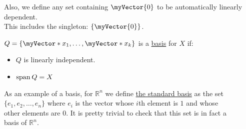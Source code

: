 \documentclass{book}
\newcommand{\teachComment}{
   \color{Orange}%
   \fontsize{12}{14}\selectfont%
}
\newcommand{\exOne}{%
   \color{Purple}%
   \fontsize{14}{16}\selectfont%
}
\newenvironment{myIndent}{%
   \begin{adjustwidth}{2.5em}{0em}%
}{%
   \end{adjustwidth}%
}
\newenvironment{myDindent}{%
   \begin{adjustwidth}{5em}{0em}%
}{%
   \end{adjustwidth}%
}
\newcommand{\udefine}[1]{{%
   \setulcolor{Red}%
   \setul{0.14em}{0.07em}%
   \ul{#1}%
}}
\newcommand{\mySpan}{\mathrm{span}}
\newcommand{\mySepTwo}[1][.]{%
   {\noindent\color{#1}{\rule{6.5in}{0.5mm}}}\\%
}
\newcommand{\retTwo}{\hfill\bigbreak}
\newcommand{\mVec}[1]{\myVector{#1}}
\newcommand{\mVecAst}[1]{\myVector*{#1}}
\begin{document}
{\begin{myDindent} \teachComment
   Also, we define any set containing $\mVec{0}$ to be automatically linearly dependent.\\
   This includes the singleton: $\{\mVec{0}\}$.\retTwo
\end{myDindent}}

$Q = \{\mVecAst{x}_1, \ldots, \mVecAst{x}_k\}$ is a \udefine{basis} for $X$ if:\\ [-18pt]
\begin{itemize}
   \item $Q$ is linearly independent.\\ [-20pt]
   \item $\mySpan\hspace{0.2em}Q = X$\retTwo
\end{itemize}

\begin{myIndent}\exOne
   As an example of a basis, for $\mathbb{R}^n$ we define \udefine{the standard basis} as the set\\ $\{e_1, e_2, \ldots, e_n\}$ where $e_i$ is the vector whose $i$th element is $1$ and whose\\ other elements are $0$. It is pretty trivial to check that this set is in fact a\\ basis of $\mathbb{R}^n$.\retTwo
\end{myIndent}

\mySepTwo
\end{document}
